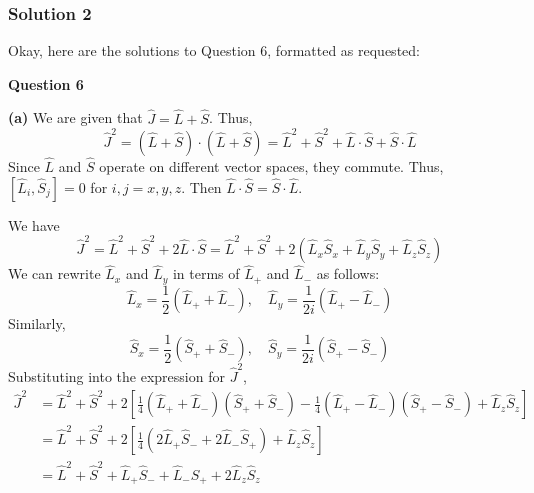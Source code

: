 \documentclass{article}
\begin{document}
\subsubsection{Solution 2}
Okay, here are the solutions to Question 6, formatted as requested:

\textbf{Question 6}

\textbf{(a)} We are given that $\hat{J} = \hat{L} + \hat{S}$. Thus,
\[
\hat{J}^2 = (\hat{L} + \hat{S}) \cdot (\hat{L} + \hat{S}) = \hat{L}^2 + \hat{S}^2 + \hat{L} \cdot \hat{S} + \hat{S} \cdot \hat{L}
\]
Since $\hat{L}$ and $\hat{S}$ operate on different vector spaces, they commute. Thus, $[\hat{L}_i, \hat{S}_j] = 0$ for $i, j = x, y, z$. Then $\hat{L} \cdot \hat{S} = \hat{S} \cdot \hat{L}$.

We have
\[
\hat{J}^2 = \hat{L}^2 + \hat{S}^2 + 2\hat{L} \cdot \hat{S} = \hat{L}^2 + \hat{S}^2 + 2(\hat{L}_x \hat{S}_x + \hat{L}_y \hat{S}_y + \hat{L}_z \hat{S}_z)
\]
We can rewrite $\hat{L}_x$ and $\hat{L}_y$ in terms of $\hat{L}_+$ and $\hat{L}_-$ as follows:
\[
\hat{L}_x = \frac{1}{2} (\hat{L}_+ + \hat{L}_-), \quad \hat{L}_y = \frac{1}{2i} (\hat{L}_+ - \hat{L}_-)
\]
Similarly,
\[
\hat{S}_x = \frac{1}{2} (\hat{S}_+ + \hat{S}_-), \quad \hat{S}_y = \frac{1}{2i} (\hat{S}_+ - \hat{S}_-)
\]
Substituting into the expression for $\hat{J}^2$,
\[
\begin{aligned}
\hat{J}^2 &= \hat{L}^2 + \hat{S}^2 + 2 \left[ \frac{1}{4} (\hat{L}_+ + \hat{L}_-) (\hat{S}_+ + \hat{S}_-) - \frac{1}{4} (\hat{L}_+ - \hat{L}_-) (\hat{S}_+ - \hat{S}_-) + \hat{L}_z \hat{S}_z \right] \\
&= \hat{L}^2 + \hat{S}^2 + 2 \left[ \frac{1}{4} (2\hat{L}_+ \hat{S}_- + 2\hat{L}_- \hat{S}_+) + \hat{L}_z \hat{S}_z \right] \\
&= \hat{L}^2 + \hat{S}^2 + \hat{L}_+ \hat{S}_- + \hat{L}_- \hat{S}_+ + 2 \hat{L}_z \hat{S}_z
\end{aligned}
\]
\end{document}
